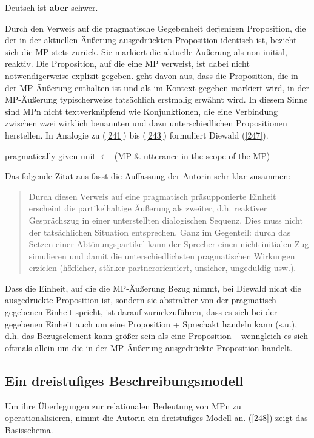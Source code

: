 \begin{exe}
	\ex\label{246} 
	Deutsch ist \textbf{aber} schwer.
\end{exe}
Durch den Verweis auf die pragmatische Gegebenheit derjenigen Proposition, die der in der aktuellen Äußerung ausgedrückten Proposition identisch ist, bezieht sich die MP stets zurück. Sie markiert die aktuelle Äußerung als non-initial, reaktiv. Die Proposition, auf die eine MP verweist, ist dabei nicht notwendigerweise explizit gegeben. \citet[417]{Diewald2006} geht davon aus, dass die Proposition, die in der MP-Äußerung enthalten ist und als im Kontext gegeben markiert wird, in der MP-Äußerung typischerweise tatsächlich erstmalig erwähnt wird. In diesem Sinne sind MPn nicht textverknüpfend wie Konjunktionen, die eine Verbindung zwischen zwei wirklich benannten und dazu unterschiedlichen Propositionen herstellen. In Analogie zu (\ref{241}) bis (\ref{243}) formuliert Diewald (\ref{247}).

\begin{exe}
	\ex\label{247} 
	pragmatically given unit $\leftarrow$ (MP \& utterance in the scope of the MP)
	\newline
	\hbox{}\hfill\hbox{\citet[417]{Diewald2006}}
\end{exe}
Das folgende Zitat aus \citet[130]{Diewald2007} fasst die Auffassung der Autorin sehr klar zusammen: 		
\begin{quotation}			
Durch diesen Verweis auf eine pragmatisch präsupponierte Einheit erscheint die partikelhaltige Äußerung als zweiter, d.h. reaktiver Gesprächszug in einer unterstellten dialogischen Sequenz. Dies muss nicht der tatsächlichen Situation entsprechen. Ganz im Gegenteil: durch das Setzen einer Abtönungspartikel kann der Sprecher einen nicht-initialen Zug simulieren und damit die unterschiedlichsten pragmatischen Wirkungen erzielen (höflicher, stärker partnerorientiert, unsicher, ungeduldig usw.).
\end{quotation}
Dass die Einheit, auf die die MP-Äußerung Bezug nimmt, bei Diewald nicht die ausgedrückte Proposition ist, sondern sie abstrakter von der \glqq pragmatisch gegebenen Einheit\grqq{} spricht, ist darauf zurückzuführen, dass es sich bei der gegebenen Einheit auch um eine Proposition + Sprechakt handeln kann (s.u.), d.h. das Bezugselement kann größer sein als eine Proposition – wenngleich es sich oftmals allein um die in der MP-Äußerung ausgedrückte Proposition handelt.

\subsection{Ein dreistufiges Beschreibungsmodell}
Um ihre Überlegungen zur relationalen Bedeutung von MPn zu operationalisieren, nimmt die Autorin ein dreistufiges Modell an. (\ref{248}) zeigt das Basisschema.

